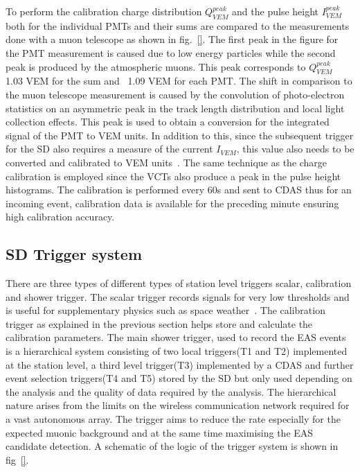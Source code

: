 To perform the calibration charge distribution $Q_{VEM}^{peak}$ and the pulse height $I_{VEM}^{peak}$ both for the individual PMTs and their sums are compared to the measurements done with a muon telescope as shown in fig.~\ref{}. The first peak in the figure for the PMT measurement is caused due to low energy particles while the second peak is produced by the atmospheric muons. This peak corresponds to $Q_{VEM}^{peak}$~ 1.03 VEM for the sum and ~1.09 VEM for each PMT. The shift in comparison to the muon telescope measurement is caused by the convolution of photo-electron statistics on an asymmetric peak in the track length distribution and local light
collection effects. This peak is used to obtain a conversion for the integrated signal of the PMT to VEM units. In addition to this, since the subsequent trigger for the SD also requires a measure of the current $I_{VEM}$, this value also needs to be converted and calibrated to VEM units~\cite{}. The same technique as the charge calibration is employed since the VCTs also produce a peak in the pulse height histograms. The calibration is performed every 60s and sent to CDAS thus for an incoming event, calibration data is available for the preceding minute ensuring high calibration accuracy. 

\subsection{SD Trigger system}
\label{sec:Sur_det_trig}
There are three types of different types of station level triggers scalar, calibration and shower trigger. The scalar trigger records signals for very low thresholds and is useful for supplementary physics such as space weather~\cite{}. The calibration trigger as explained in the previous section helps store and calculate the calibration parameters. The main shower trigger, used to record the EAS events is a hierarchical system consisting of two local triggers(T1 and T2) implemented at the station level, a third level trigger(T3) implemented by a CDAS and further event selection triggers(T4 and T5) stored by the SD but only used depending on the analysis and the quality of data required by the analysis. The hierarchical nature arises from the limits on the wireless communication network required for a vast autonomous array. The trigger aims to reduce the rate especially for the expected muonic background and at the same time maximising the EAS candidate detection. A schematic of the logic of the trigger system is shown in fig~\ref{}. 

